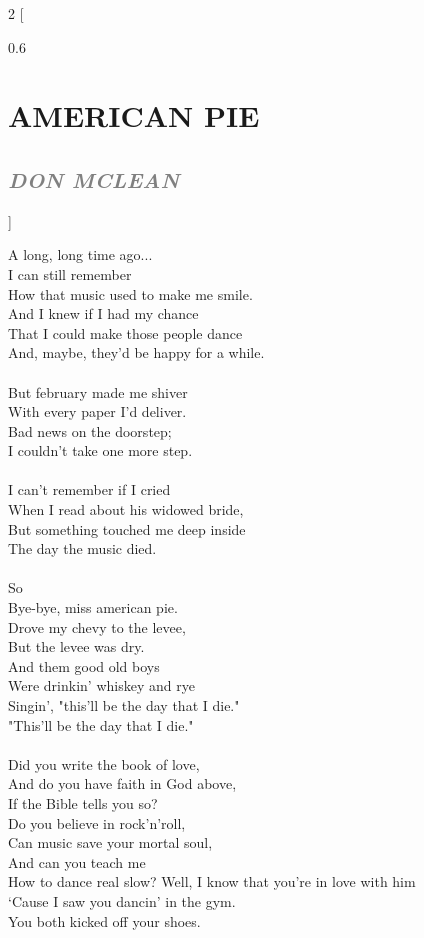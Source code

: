 \documentclass[100pt,a4paper]{report}
\newenvironment{song2}[2]
	{	
    	\begin{multicols*}{2}
		[
			\begin{spacing}{0.6}
				\section*{\LARGE\centering \MakeUppercase{\textbf{{#1}}}}
				\subsection*{\Large\centering \textit{\textcolor{gray}{\MakeUppercase{{#2}}}}}
			\end{spacing}
		]
		\Large
	}
	{
	\end{multicols*}
	\newpage
    }
\begin{document}
\begin{song2}{American Pie}{Don McLean}
\noindent
A long, long time ago...\\
I can still remember\\
How that music used to make me smile.\\
And I knew if I had my chance\\
That I could make those people dance\\
And, maybe, they'd be happy for a while.\\
\\
But february made me shiver\\
With every paper I'd deliver.\\
Bad news on the doorstep;\\
I couldn't take one more step.\\
\\
I can't remember if I cried\\
When I read about his widowed bride,\\
But something touched me deep inside\\
The day the music died.\\
\\
So\\
Bye-bye, miss american pie.\\
Drove my chevy to the levee,\\
But the levee was dry.\\
And them good old boys\\ 
Were drinkin' whiskey and rye\\
Singin', "this'll be the day that I die."\\
"This'll be the day that I die."\\
\\
Did you write the book of love,\\
And do you have faith in God above,\\
If the Bible tells you so?\\
Do you believe in rock'n'roll,\\
Can music save your mortal soul,\\
And can you teach me\\ 
How to dance real slow?
\vfill
\columnbreak
\noindent
Well, I know that you're in love with him\\
`Cause I saw you dancin' in the gym.\\
You both kicked off your shoes.\\

\end{song2}
\end{document}

